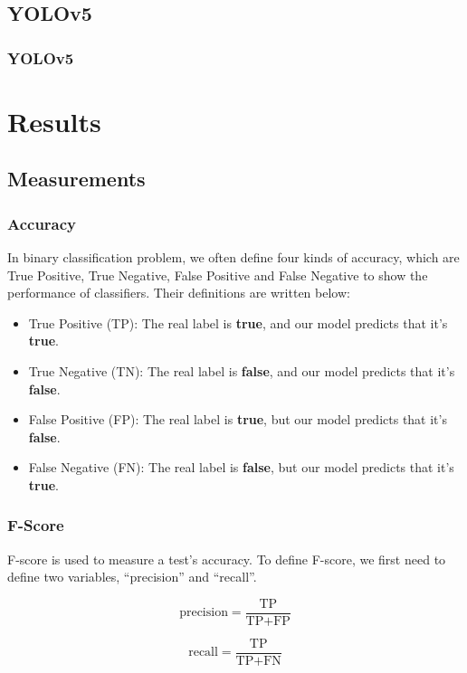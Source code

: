 \documentclass{article}[12pt]
\begin{document}
\subsection{YOLOv5}


\subsubsection{YOLOv5}
\section{Results}
\subsection{Measurements}
\subsubsection{Accuracy}
In binary classification problem, we often define four kinds of accuracy, 
which are True Positive, True Negative, False Positive and False Negative 
to show the performance of classifiers. Their definitions are written below:
\begin{itemize}
    \item True Positive (TP): The real label is \textbf{true}, 
    and our model predicts that it's \textbf{true}.
    \item True Negative (TN): The real label is \textbf{false}, 
    and our model predicts that it's \textbf{false}.
    \item False Positive (FP): The real label is \textbf{true}, 
    but our model predicts that it's \textbf{false}.
    \item False Negative (FN): The real label is \textbf{false}, 
    but our model predicts that it's \textbf{true}.
\end{itemize}
\subsubsection{F-Score}
F-score is used to measure a test's accuracy. 
To define F-score, we first need to define two variables, 
``precision'' and ``recall''.

\begin{equation}
    \text {precision}=\frac{\text{TP}}{\text{TP}+\text{FP}}
\end{equation}

\begin{equation}
    \text {recall}=\frac{\text{TP}}{\text{TP}+\text{FN}}
\end{equation}
\end{document}

